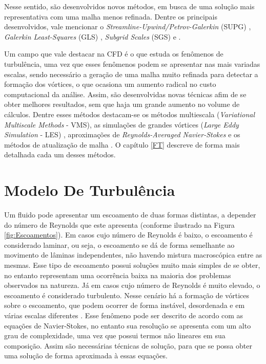 \documentclass[_ArquivoPrincipal.tex]{subfiles}
\begin{document}
Nesse sentido, são desenvolvidos novos métodos, em busca de uma solução mais representativa com uma malha menos refinada. Dentre os principais desenvolvidos, vale mencionar o \textit{Streamline-Upwind/Petrov-Galerkin} (SUPG) \cite{brooks1982streamline}, \textit{Galerkin Least-Squares} (GLS) \cite{hughes1989new,tezduyar1991stabilized}, \textit{Subgrid Scales} (SGS) e \cite{hughes1995multiscale}.

Um campo que vale destacar na CFD é o que estuda os fenômenos de turbulência, uma vez que esses fenômenos podem se apresentar nas mais variadas escalas, sendo necessário a geração de uma malha muito refinada para detectar a formação dos vórtices, o que ocasiona um aumento radical no custo computacional da análise. Assim, são desenvolvidas novas técnicas afim de se obter melhores resultados, sem que haja um grande aumento no volume de cálculos. Dentre esses métodos destacam-se os métodos multiescala (\textit{Variational Multiscale Methods} - VMS), as simulações de grandes vórtices (\textit{Large Eddy Simulation} - LES) \cite{hughes1995multiscale,hughes1998variational,hughes2002variational,bazilevs2010large,vsekutkovski2021partitioned}, aproximações de \textit{Reynolds-Averaged Navier-Stokes} \cite{alfonsi2009reynolds} e os métodos de atualização de malha \cite{de1993petrov}. O capítulo \ref{FT} descreve de forma mais detalhada cada um desses métodos.

\section{Modelo De Turbulência} \label{MT}

Um fluido pode apresentar um escoamento de duas formas distintas, a depender do número de Reynolds que este apresenta (conforme ilustrado na Figura \ref{fig:Escoamentos}). Em casos cujo número de Reynolds é baixo, o escoamento é considerado laminar, ou seja, o escoamento se dá de forma semelhante ao movimento de lâminas independentes, não havendo mistura macroscópica entre as mesmas. Esse tipo de escoamento possui soluções muito mais simples de se obter, no entanto representam uma ocorrência baixa na maioria dos problemas observados na natureza. Já em casos cujo número de Reynolds é muito elevado, o escoamento é considerado turbulento. Nesse cenário há a formação de vórtices sobre o escoamento, que podem ocorrer de forma instável, desordenada e em várias escalas diferentes \cite{popiolek2005analise,shaughnessy2005introduction}. Esse fenômeno pode ser descrito de acordo com as equações de Navier-Stokes, no entanto sua resolução se apresenta com um alto grau de complexidade, uma vez que possui termos não lineares em sua composição. Assim são necessárias técnicas de solução, para que se possa obter uma solução de forma aproximada à essas equações.
\end{document}
